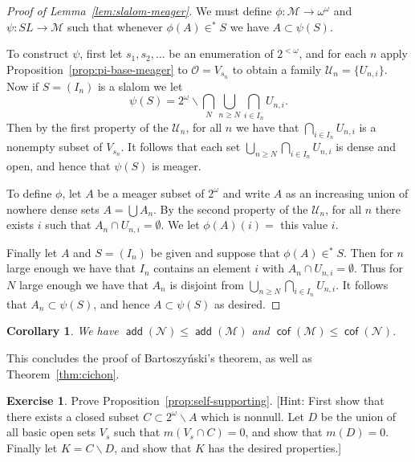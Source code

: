 \documentclass[11pt,oneside]{amsbook}
\newcommand{\Null}{\mathcal N}
\newcommand{\Meager}{\mathcal M}
\DeclareMathOperator{\add}{\mathsf{add}}
\DeclareMathOperator{\cof}{\mathsf{cof}}
\theoremstyle{definition}
\newtheorem{exerc}{Exercise}[section]
\theoremstyle{plain}
\newtheorem{cor}[thm]{Corollary}
\theoremstyle{definition}
\theoremstyle{remark}
\numberwithin{equation}{section}
\numberwithin{figure}{section}
\begin{document}
\begin{proof}[Proof of Lemma~\ref{lem:slalom-meager}]
  We must define $\phi\colon\Meager\to\omega^\omega$ and $\psi\colon SL\to\Meager$ such that whenever $\phi(A)\in^*S$ we have $A\subset\psi(S)$.

  To construct $\psi$, first let $s_1,s_2,\ldots$ be an enumeration of $2^{<\omega}$, and for each $n$ apply Proposition~\ref{prop:pi-base-meager} to $\mathcal O=V_{s_n}$ to obtain a family $\mathcal U_n=\{U_{n,i}\}$. Now if $S=(I_n)$ is a slalom we let
  \[\psi(S)=2^\omega\smallsetminus\bigcap_N\bigcup_{n\geq N}\bigcap_{i\in I_n}U_{n,i}\text{.}
  \]
  Then by the first property of the $\mathcal U_n$, for all $n$ we have that $\bigcap_{i\in I_n}U_{n,i}$ is a nonempty subset of $V_{s_n}$. It follows that each set $\bigcup_{n\geq N}\bigcap_{i\in I_n}U_{n,i}$ is dense and open, and hence that $\psi(S)$ is meager.

  To define $\phi$, let $A$ be a meager subset of $2^\omega$ and write $A$ as an increasing union of nowhere dense sets $A=\bigcup A_n$. By the second property of the $\mathcal U_n$, for all $n$ there exists $i$ such that $A_n\cap U_{n,i}=\emptyset$. We let $\phi(A)(i)=$ this value $i$.

  Finally let $A$ and $S=(I_n)$ be given and suppose that $\phi(A)\in^*S$. Then for $n$ large enough we have that $I_n$ contains an element $i$ with $A_n\cap U_{n,i}=\emptyset$. Thus for $N$ large enough we have that $A_n$ is disjoint from $\bigcup_{n\geq N}\bigcap_{i\in I_n}U_{n,i}$. It follows that $A_n\subset\psi(S)$, and hence $A\subset\psi(S)$ as desired.
\end{proof}

\begin{cor}
  We have $\add(\Null)\leq\add(\Meager)$ and $\cof(\Meager)\leq\cof(\Null)$.
\end{cor}

This concludes the proof of Bartoszy\'nski's theorem, as well as Theorem~\ref{thm:cichon}.

\begin{exerc}
  \label{exerc:self-supporting}
  Prove Proposition~\ref{prop:self-supporting}. [Hint: First show that there exists a closed subset $C\subset2^\omega\smallsetminus A$ which is nonnull. Let $D$ be the union of all basic open sets $V_s$ such that $m(V_s\cap C)=0$, and show that $m(D)=0$. Finally let $K=C\smallsetminus D$, and show that $K$ has the desired properties.]
\end{exerc}
\end{document}
